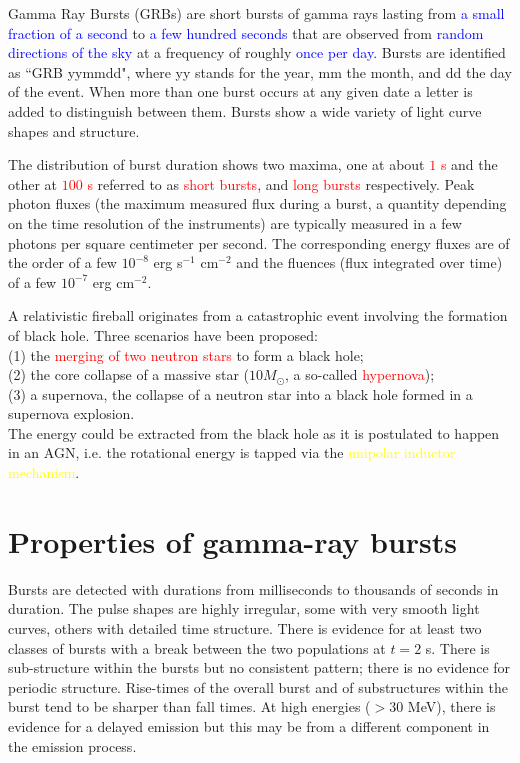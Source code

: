\documentclass[12pt,a4paper]{article}
\begin{document}
\cite{weekes2003very} 


\cite{courvoisier2012high} Gamma Ray Bursts (GRBs) are short bursts of gamma rays lasting from \textcolor{blue}{a small fraction of a second} to \textcolor{blue}{a few hundred seconds} that are observed from \textcolor{blue}{random directions of the sky} at a frequency of roughly \textcolor{blue}{once per day}. Bursts are identified as ``GRB yymmdd", where yy stands for the year, mm the month, and dd the day of the event. When more than one burst occurs at any given date a letter is added to distinguish between them. Bursts show a wide variety of light curve shapes and structure. 

The distribution of burst duration shows two maxima, one at about \textcolor{red}{$1$ s} and the other at \textcolor{red}{$100$ s} referred to as \textcolor{red}{short bursts}, and \textcolor{red}{long bursts} respectively. Peak photon fluxes (the maximum measured flux during a burst, a quantity depending on the time resolution of the instruments) are typically measured in a few photons per square centimeter per second. The corresponding energy fluxes are of the order of a few $10^{-8}$ erg s$^{-1}$ cm$^{-2}$ and the fluences (flux integrated over time) of a few $10^{-7}$ erg cm$^{-2}$. 

\cite{weekes2003very} A relativistic fireball originates from a catastrophic event involving the formation of black hole. Three scenarios have been proposed: \\
(1) the \textcolor{red}{merging of two neutron stars} to form a black hole; \\
(2) the core collapse of a massive star ($10 M_\odot$, a so-called \textcolor{red}{hypernova}); \\
(3) a supernova, the collapse of a neutron star into a black hole formed in a supernova explosion. \\
The energy could be extracted from the black hole as it is postulated to happen in an AGN, i.e. the rotational energy is tapped via the \textcolor{yellow}{unipolar inductor mechanism}.

\section{Properties of gamma-ray bursts}
\cite{weekes2003very} Bursts are detected with durations from milliseconds to thousands of seconds in duration. The pulse shapes are highly irregular, some with very smooth light curves, others with detailed time structure. There is evidence for at least two classes of bursts with a break between the two populations at $t = 2$ s. There is sub-structure within the bursts but no consistent pattern; there is no evidence for periodic structure. Rise-times of the overall burst and of substructures within the burst tend to be sharper than fall times. At high energies ($> 30$ MeV), there is evidence for a delayed emission but this may be from a different component in the emission process. 
\end{document}
